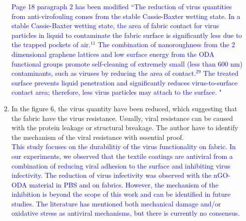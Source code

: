 \documentclass[12pt]{letter}
\newcommand{\blue}[1]{\textcolor{blue}{#1}} %
\begin{document}
\begin{enumerate}
\blue{Page 18 paragraph 2 has been modified ``The reduction of virus quantities from anti-virofouling comes from the stable Cassie-Baxter wetting state. In a stable Cassie-Baxter wetting state, the area of fabric contact for virus particles in liquid to contaminate the fabric surface is significantly less due to the trapped pockets of air.$^{11}$ The  combination of nanoroughness from the 2 dimensional graphene lattices and low surface energy from the ODA functional groups promote self-cleaning of extremely small (less than 600 nm) contaminants, such as viruses by reducing the area of contact.$^{29}$  The treated surface prevents liquid penetration and significantly reduces virus-to-surface contact area; therefore, less virus particles may attach to the surface. "}

\item    In the figure 6, the virus quantity have been reduced, which suggesting that the fabric have the virus resistance. Usually, viral resistance can be caused with the protein leakage or structural breakage. The author have to identify the mechanism of the viral resistance with essential proof.\\
\blue{This study focuses on the durabilitiy of the virus functionality on fabric. In our experiments, we observed that the textile coatings are antiviral from a combination of reducing viral adhesion to the surface and  
inhibiting virus infectivity.  
The reduction of virus infectivity was observed with the nGO-ODA material in PBS and on fabrics. 
However, the mechanism of the inhibition is beyond the scope of this work and can be identified in future studies.  The literature has mentioned both mechanical damage and/or oxidative stress as antiviral mechanisms, but there is currently no consensus.} 



\end{enumerate}
\end{document}
